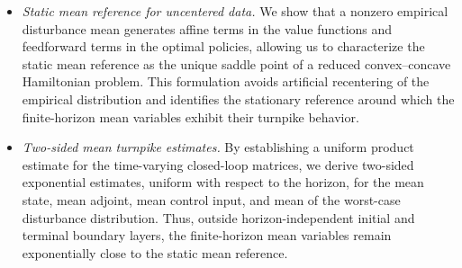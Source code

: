\documentclass[10pt,journal,twoside]{IEEEtran}
\theoremstyle{definition}
\theoremstyle{remark}
\begin{document}
\begin{itemize}
	
	\item {\it Static mean reference for uncentered data.}
    We show that a nonzero empirical disturbance mean generates affine terms in
	the value functions and feedforward terms in the optimal policies, allowing us to characterize the static mean reference as the unique saddle point of a reduced convex--concave Hamiltonian problem. This formulation avoids artificial recentering of the empirical distribution and identifies the stationary reference around which the finite-horizon mean variables exhibit their turnpike behavior.

  
    
	
	\item {\it Two-sided mean turnpike estimates.} 
    By establishing a uniform product estimate for the time-varying closed-loop matrices, we derive two-sided exponential estimates, uniform with respect to the horizon, for the mean state, mean adjoint, mean control input, and mean of the worst-case disturbance distribution. Thus, outside horizon-independent initial and terminal boundary layers, the finite-horizon mean variables remain exponentially close to the static mean reference.
    
    

\end{itemize}
\end{document}
